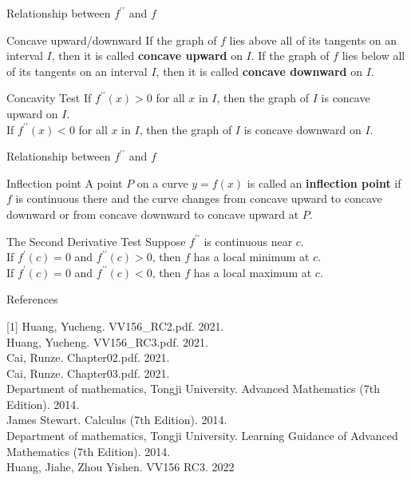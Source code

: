 \begin{frame}{Relationship between $f^{\prime\prime}$ and $f$}
    \begin{block}{Concave upward/downward}
        If the graph of $f$ lies above all of its tangents on an interval $I$, then it is called \textbf{concave upward} on $I$. If the graph of $f$ lies below all of its tangents on an interval $I$, then it is called \textbf{concave downward} on $I$.
    \end{block}
    \begin{block}{Concavity Test}
        If $f^{\prime\prime}(x)>0$ for all $x$ in $I$, then the graph of $I$ is concave upward on $I$.\\
        If $f^{\prime\prime}(x)<0$ for all $x$ in $I$, then the graph of $I$ is concave downward on $I$.
    \end{block}
\end{frame}



\begin{frame}{Relationship between $f^{\prime\prime}$ and $f$}
    \begin{block}{Inflection point}
        A point $P$ on a curve $y=f(x)$ is called an \textbf{inflection point} if $f$ is continuous there and the curve changes from concave upward to concave downward or from concave downward to concave upward at $P$.
    \end{block}
    \begin{block}{The Second Derivative Test}
        Suppose $f^{\prime\prime}$ is continuous near $c$.\\
        If $f^\prime(c)=0$ and $f^{\prime\prime}(c)>0$, then $f$ has a local minimum at $c$.\\
        If $f^\prime(c)=0$ and $f^{\prime\prime}(c)<0$, then $f$ has a local maximum at $c$.
    \end{block}
\end{frame}



\begin{frame}{References}

    [1] Huang, Yucheng. VV156\_RC2.pdf. 2021.\\
    \bigskip
    [2] Huang, Yucheng. VV156\_RC3.pdf. 2021.\\
    \bigskip
    [3] Cai, Runze. Chapter02.pdf. 2021.\\
    \bigskip
    [4] Cai, Runze. Chapter03.pdf. 2021.\\
    \bigskip
    [5] Department of mathematics, Tongji University. Advanced Mathematics (7th Edition). 2014.\\
    \bigskip
    [6] James Stewart. Calculus (7th Edition). 2014.\\
    \bigskip
    [7] Department of mathematics, Tongji University. Learning Guidance of Advanced Mathematics (7th Edition). 2014.\\
    \bigskip
    [8]Huang, Jiahe, Zhou Yishen. VV156 RC3. 2022\\
\end{frame}
